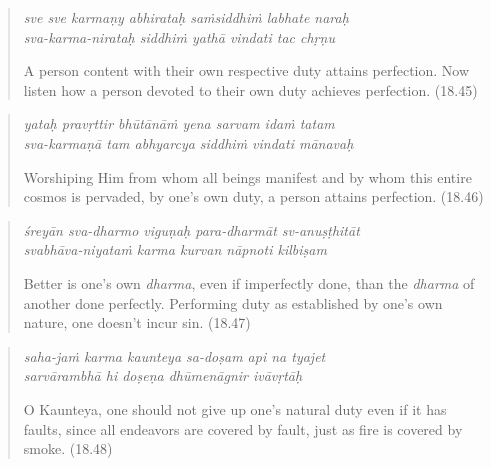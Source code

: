 \documentclass[12pt, twoside, openright]{memoir}
\begin{document}
\par
\begin{verse}
\textit{sve sve karmaṇy abhirataḥ saṁsiddhiṁ labhate naraḥ} \\
\textit{sva-karma-nirataḥ siddhiṁ yathā vindati tac chṛṇu}

\noindent A person content with their own respective duty attains perfection. Now listen how a person devoted to their own duty achieves perfection. (18.45)
\end{verse}
\par



\par
\begin{verse}
\textit{yataḥ pravṛttir bhūtānāṁ yena sarvam idaṁ tatam} \\
\textit{sva-karmaṇā tam abhyarcya siddhiṁ vindati mānavaḥ}

\noindent Worshiping Him from whom all beings manifest and by whom this entire cosmos is pervaded, by one’s own duty, a person attains perfection. (18.46)
\end{verse}
\par



\par
\begin{verse}
\textit{śreyān sva-dharmo viguṇaḥ para-dharmāt sv-anuṣṭhitāt} \\
\textit{svabhāva-niyataṁ karma kurvan nāpnoti kilbiṣam}

\noindent Better is one’s own \textit{dharma}, even if imperfectly done, than the \textit{dharma} of another done perfectly. Performing duty as established by one’s own nature, one doesn't incur sin. (18.47)
\end{verse}
\par



\par
\begin{verse}
\textit{saha-jaṁ karma kaunteya sa-doṣam api na tyajet} \\
\textit{sarvārambhā hi doṣeṇa dhūmenāgnir ivāvṛtāḥ}

\noindent O Kaunteya, one should not give up one's natural duty even if it has faults, since all endeavors are covered by fault, just as fire is covered by smoke. (18.48)
\end{verse}
\par
\end{document}
